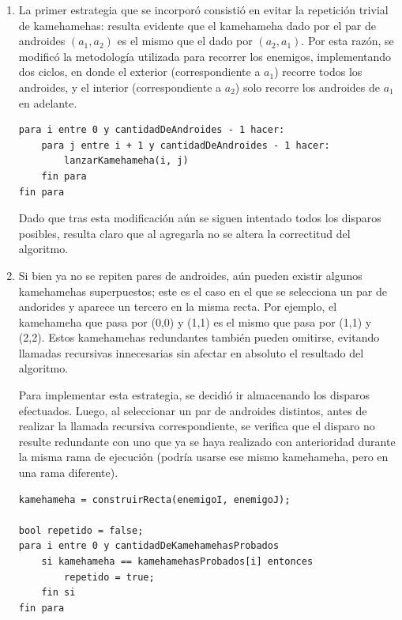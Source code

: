     \begin{enumerate}
        \item La primer estrategia que se incorporó consistió en evitar la repetición trivial de kamehamehas: resulta evidente que el kamehameha dado por el par de androides $(a_1, a_2)$ es el mismo que el dado por $(a_2, a_1)$. Por esta razón, se modificó la metodología utilizada para recorrer los enemigos, implementando dos ciclos, en donde el exterior (correspondiente a $a_1$) recorre todos los androides, y el interior (correspondiente a $a_2$) solo recorre los androides de $a_1$ en adelante.

        \begin{codesnippet}
        \begin{verbatim}
para i entre 0 y cantidadDeAndroides - 1 hacer:
    para j entre i + 1 y cantidadDeAndroides - 1 hacer:
        lanzarKamehameha(i, j)
    fin para
fin para
        \end{verbatim}
        \end{codesnippet}

        Dado que tras esta modificación aún se siguen intentado todos los disparos posibles, resulta claro que al agregarla no se altera la correctitud del algoritmo.

        \item Si bien ya no se repiten pares de androides, aún pueden existir algunos kamehamehas superpuestos; este es el caso en el que se selecciona un par de andorides y aparece un tercero en la misma recta. Por ejemplo, el kamehameha que pasa por (0,0) y (1,1) es el mismo que pasa por (1,1) y (2,2). Estos kamehamehas redundantes también pueden omitirse, evitando llamadas recursivas innecesarias sin afectar en absoluto el resultado del algoritmo.

        Para implementar esta estrategia, se decidió ir almacenando los disparos efectuados. Luego, al seleccionar un par de androides distintos, antes de realizar la llamada recursiva correspondiente, se verifica que el disparo no resulte redundante con uno que ya se haya realizado con anterioridad durante la misma rama de ejecución (podría usarse ese mismo kamehameha, pero en una rama diferente).

        \begin{codesnippet}
        \begin{verbatim}
kamehameha = construirRecta(enemigoI, enemigoJ);

bool repetido = false;
para i entre 0 y cantidadDeKamehamehasProbados
    si kamehameha == kamehamehasProbados[i] entonces
        repetido = true;
    fin si
fin para


\end{verbatim}
\end{codesnippet}
\end{enumerate}
